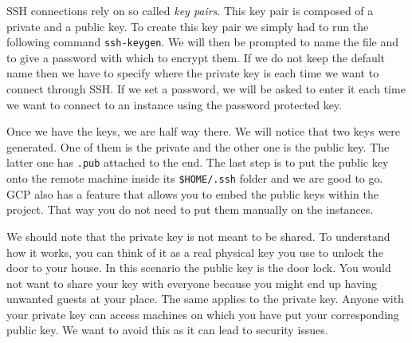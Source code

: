 SSH connections rely on so called \textit{key pairs}. This key pair is
composed of a private and a public key. To create this key pair we
simply had to run the following command \verb|ssh-keygen|. We will
then be prompted to name the file and to give a password with which to
encrypt them. If we do not keep the default name then we have to
specify where the private key is each time we want to connect through
SSH. If we set a password, we will be asked to enter it each time we
want to connect to an instance using the password protected key.

Once we have the keys, we are half way there. We will notice that two
keys were generated. One of them is the private and the other one is
the public key. The latter one has \verb|.pub| attached to the end.
The last step is to put the public key onto the remote machine inside
its \verb|$HOME/.ssh| folder and we are good to go. GCP also has a
feature that allows you to embed the public keys within the project.
That way you do not need to put them manually on the instances.

We should note that the private key is not meant to be shared. To
understand how it works, you can think of it as a real physical key
you use to unlock the door to your house. In this scenario the public
key is the door lock. You would not want to share your key with
everyone because you might end up having unwanted guests at your
place. The same applies to the private key.  Anyone with your private
key can access machines on which you have put your corresponding
public key. We want to avoid this as it can lead to security issues.
